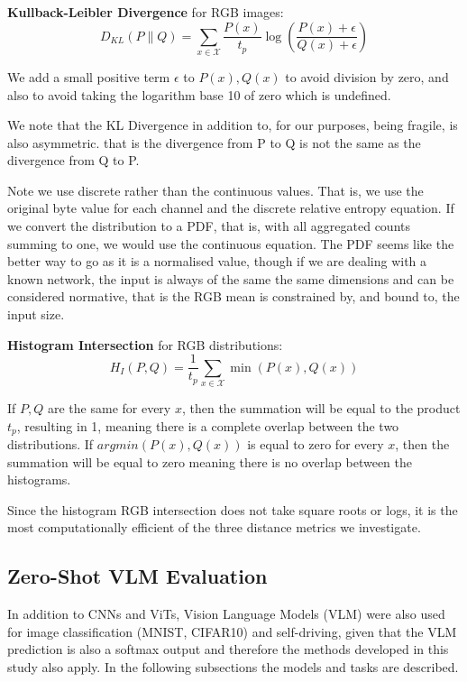 \textbf{Kullback-Leibler Divergence} for RGB images:
\begin{equation}
 D_{KL}(P \parallel Q) = \sum\limits_{x\in\mathcal{X}} \frac{P(x)}{t_p} \log\left(\frac{P(x)+\epsilon}{Q(x)+\epsilon}\right)
\end{equation}

We add a small positive term $ \epsilon $ to $ P(x), Q(x) $ to avoid division by zero, and also to avoid taking the logarithm base 10 of zero which is undefined.

We note that the KL Divergence in addition to, for our purposes, being fragile, is also asymmetric. that is the divergence from P to Q is not the same as the divergence from Q to P.

Note we use discrete rather than the continuous values. That is, we use the original byte value for each channel and the discrete relative entropy equation. If we convert the distribution to a PDF, that is, with all aggregated counts summing to one, we would use the continuous equation. The PDF seems like the better way to go as it is a normalised value, though if we are dealing with a known network, the input is always of the same the same dimensions and can be considered normative, that is the RGB mean is constrained by, and bound to, the input size.

\textbf{Histogram Intersection} for RGB distributions:
\begin{equation}
  H_{I}(P, Q) = \frac{1}{t_p} \sum\limits_{x\in\mathcal{X}}\min(P(x), Q(x))   
\end{equation}

If $P,Q$ are the same for every $ x $, then the summation will be equal to the product $t_p$, resulting in 1, meaning there is a complete overlap between the two distributions. If $argmin(P(x), Q(x))$ is equal to zero for every $x$, then the summation will be equal to zero meaning there is no overlap between the histograms.

Since the histogram RGB intersection does not take square roots or logs, it is the most computationally efficient of the three distance metrics we investigate.


\subsection{Zero-Shot VLM Evaluation}

In addition to CNNs and ViTs, Vision Language Models (VLM) were also used for image classification (MNIST, CIFAR10) and self-driving, given that the VLM prediction is also a softmax output and therefore the methods developed in this study also apply. In the following subsections the models and tasks are described.

